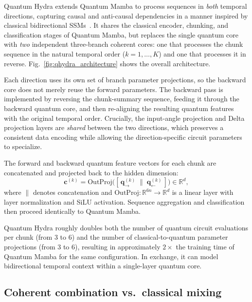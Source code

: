 \documentclass[conference]{IEEEtran}
\begin{document}
Quantum Hydra extends Quantum Mamba to process sequences in \emph{both} temporal directions, capturing causal and anti-causal dependencies in a manner inspired by classical bidirectional SSMs~\cite{Hwang}.
It shares the classical encoder, chunking, and classification stages of Quantum Mamba, but replaces the single quantum core with \emph{two} independent three-branch coherent cores: one that processes the chunk sequence in the natural temporal order ($k = 1, \ldots, K$) and one that processes it in reverse.
Fig.~\ref{fig:qhydra_architecture} shows the overall architecture.
 

Each direction uses its own set of branch parameter projections, so the backward core does not merely reuse the forward parameters.
The backward pass is implemented by reversing the chunk-summary sequence, feeding it through the backward quantum core, and then re-aligning the resulting quantum features with the original temporal order.
Crucially, the input-angle projection and Delta projection layers are \emph{shared} between the two directions, which preserves a consistent data encoding while allowing the direction-specific circuit parameters to specialize.

The forward and backward quantum feature vectors for each chunk are concatenated and projected back to the hidden dimension:
\begin{equation}
    \mathbf{c}^{(k)} = \mathrm{OutProj}\!\Big([\,\mathbf{q}_{\rightarrow}^{(k)} \;\|\; \mathbf{q}_{\leftarrow}^{(k)}\,]\Big) \in \mathbb{R}^{d},
    \label{eq:bidir_fusion}
\end{equation}
where $\|$ denotes concatenation and $\mathrm{OutProj}: \mathbb{R}^{6n} \to \mathbb{R}^{d}$ is a linear layer with layer normalization and SiLU activation.
Sequence aggregation and classification then proceed identically to Quantum Mamba.

Quantum Hydra roughly doubles both the number of quantum circuit evaluations per chunk (from 3 to 6) and the number of classical-to-quantum parameter projections (from 3 to 6), resulting in approximately $2\times$ the training time of Quantum Mamba for the same configuration.
In exchange, it can model bidirectional temporal context within a single-layer quantum core.

\subsection{Coherent combination vs.\ classical mixing}
\label{sec:rationale}
\end{document}
